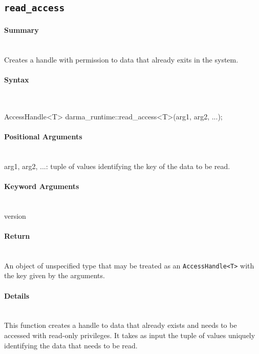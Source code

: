 \subsection{\texttt{read\_access}}

\paragraph{Summary}\mbox{}\\
Creates a handle with  permission to data that already exits in
the system.

\paragraph{Syntax}\mbox{}\\
\begin{CppCode}
AccessHandle<T> darma_runtime::read_access<T>(arg1, arg2, ...);
\end{CppCode}

\paragraph{Positional Arguments}\mbox{}\\
arg1, arg2, ...: tuple of values identifying the key of the data to be read.

\paragraph{Keyword Arguments}\mbox{}\\
version 

\paragraph{Return}\mbox{}\\
An object of unspecified type that may be treated as an \texttt{AccessHandle<T>}
with the key given by the arguments.

\paragraph{Details}\mbox{}\\
This function creates a handle to data that already exists and 
needs to be accessed with read-only privileges. 
It takes as input the tuple of values uniquely 
identifying the data that needs to be read.  


